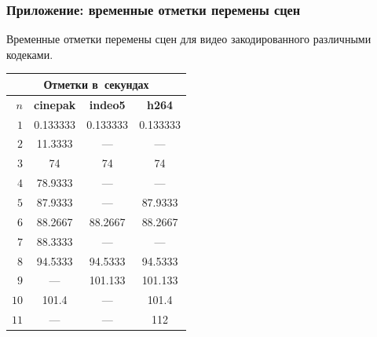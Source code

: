 \begin{frame}
    \frametitle{Приложение: временные отметки перемены сцен}

    Временные отметки перемены сцен
    для видео закодированного различными кодеками.
    \begin{center}
        \footnotesize
        \begin{tabular}{|r|c|c|c|}
            \hline
            \multicolumn{4}{|c|}{\footnotesize Отметки в~секундах} \\
            \hline $n$
                & \textbf{cinepak}
                &   \textbf{indeo5}
                &   \textbf{h264} \\
            \hline $1$  &0.133333   & 0.133333  & 0.133333  \\
            \hline $2$  &11.3333    & ---       & ---       \\
            \hline $3$  &74         & 74        & 74        \\
            \hline $4$  &78.9333    & ---       & ---       \\
            \hline $5$ &87.9333    & ---       & 87.9333   \\
            \hline $6$ &88.2667    & 88.2667   & 88.2667   \\
            \hline $7$ &88.3333    & ---       & ---       \\
            \hline $8$ &94.5333    & 94.5333   & 94.5333   \\
            \hline $9$ & ---       & 101.133   & 101.133   \\
            \hline $10$ &101.4      & ---       & 101.4     \\
            \hline $11$ &    ---    & ---       & 112       \\
            \hline
        \end{tabular}
    \end{center}
\end{frame}

